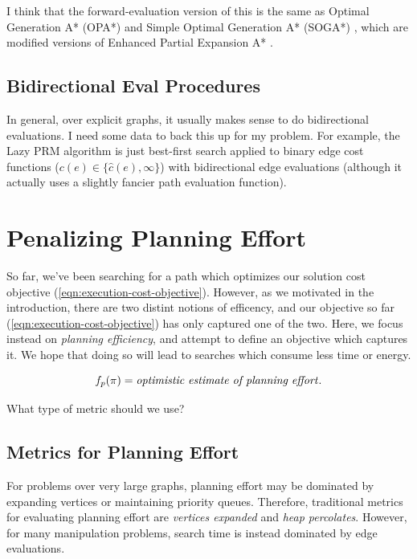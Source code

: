 \documentclass{report}
\begin{document}
I think that the forward-evaluation version of this is the same as
Optimal Generation A* (OPA*) and Simple Optimal Generation A* (SOGA*)
\cite{goldenberg2013epeastar},
which are modified versions of
Enhanced Partial Expansion A* \cite{felner2012epastar}.

\subsection{Bidirectional {\sc Eval} Procedures}

In general, over explicit graphs,
it usually makes sense to do bidirectional evaluations.
I need some data to back this up for my problem.
For example,
the Lazy PRM algorithm \cite{bohlin2000lazyprm}
is just best-first search
applied to binary edge cost functions
($c(e) \in \{ \hat{c}(e), \infty \}$)
with bidirectional edge evaluations
(although it actually uses a slightly fancier path evaluation function).

\section{Penalizing Planning Effort}

So far, we've been searching for a path which optimizes our solution
cost objective (\ref{eqn:execution-cost-objective}).
However, as we motivated in the introduction,
there are two distint notions of efficency,
and our objective so far (\ref{eqn:execution-cost-objective})
has only captured one of the two.
Here, we focus instead on \emph{planning efficiency},
and attempt to define an objective which captures it.
We hope that doing so will lead to searches which consume less 
time or energy.

\begin{equation}
   f_p(\pi) = \mbox{\emph{optimistic estimate of planning effort}}.
\end{equation}

What type of metric should we use?

\subsection{Metrics for Planning Effort}

For problems over very large graphs,
planning effort may be dominated by expanding vertices
or maintaining priority queues.
Therefore, traditional metrics for evaluating planning
effort are \emph{vertices expanded}
and \emph{heap percolates}.
However, for many manipulation problems,
search time is instead dominated by edge evaluations.
\end{document}

